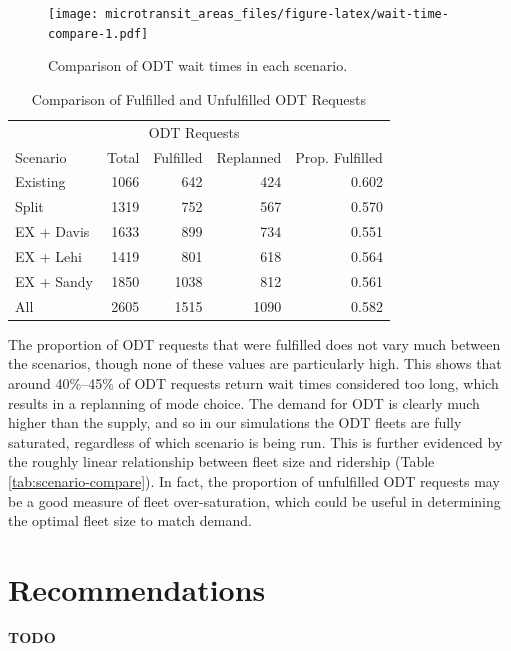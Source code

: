 \documentclass[
]{report}
\begin{document}
\begin{figure}
\centering
\texttt{[image: microtransit\_areas\_files/figure-latex/wait-time-compare-1.pdf]}
\caption{\label{fig:wait-time-compare}Comparison of ODT wait times in each scenario.}
\end{figure}

\begin{table}

\caption{\label{tab:odt-fulfillment}Comparison of Fulfilled and Unfulfilled ODT Requests}
\centering
\begin{tabular}[t]{lrrrr}
\toprule
\multicolumn{1}{c}{} & \multicolumn{3}{c}{ODT Requests} & \multicolumn{1}{c}{} \\
\cmidrule(l{3pt}r{3pt}){2-4}
Scenario & Total & Fulfilled & Replanned & Prop. Fulfilled\\
\midrule
Existing & 1066 & 642 & 424 & 0.602\\
Split & 1319 & 752 & 567 & 0.570\\
EX + Davis & 1633 & 899 & 734 & 0.551\\
EX + Lehi & 1419 & 801 & 618 & 0.564\\
EX + Sandy & 1850 & 1038 & 812 & 0.561\\
\addlinespace
All & 2605 & 1515 & 1090 & 0.582\\
\bottomrule
\end{tabular}
\end{table}

The proportion of ODT requests that were fulfilled does not vary much between the scenarios, though none of these values are particularly high. This shows that around 40\%--45\% of ODT requests return wait times considered too long, which results in a replanning of mode choice. The demand for ODT is clearly much higher than the supply, and so in our simulations the ODT fleets are fully saturated, regardless of which scenario is being run. This is further evidenced by the roughly linear relationship between fleet size and ridership (Table \ref{tab:scenario-compare}). In fact, the proportion of unfulfilled ODT requests may be a good measure of fleet over-saturation, which could be useful in determining the optimal fleet size to match demand.

\hypertarget{recommendations}{%
\chapter{Recommendations}\label{recommendations}}

\textbf{TODO}
\end{document}
